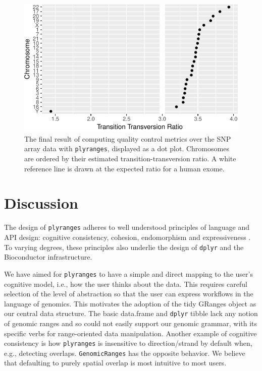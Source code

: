 \documentclass[]{article}
\begin{document}
\begin{figure}

{\centering \includegraphics{./diagrams/titv-viz-1} 

}

\caption{The final result of computing quality control metrics over the SNP array data with \texttt{plyranges}, displayed as a dot plot. Chromosomes are ordered by their estimated transition-transversion ratio. A white reference line is drawn at the expected ratio for a human exome.}\label{fig:titv-viz}
\end{figure}

\hypertarget{discussion}{%
\section{Discussion}\label{discussion}}

The design of \texttt{plyranges} adheres to well understood principles
of language and API design: cognitive consistency, cohesion,
endomorphism and expressiveness \cite{Green1996-qg}. To varying degrees,
these principles also underlie the design of \texttt{dplyr} and the
Bioconductor infrastructure.

We have aimed for \texttt{plyranges} to have a simple and direct mapping
to the user's cognitive model, i.e., how the user thinks about the data.
This requires careful selection of the level of abstraction so that the
user can express workflows in the language of genomics. This motivates
the adoption of the tidy GRanges object as our central data structure.
The basic data.frame and \texttt{dplyr} tibble lack any notion of
genomic ranges and so could not easily support our genomic grammar, with
its specific verbs for range-oriented data manipulation. Another example
of cognitive consistency is how \texttt{plyranges} is insensitive to
direction/strand by default when, e.g., detecting overlaps.
\texttt{GenomicRanges} has the opposite behavior. We believe that
defaulting to purely spatial overlap is most intuitive to most users.
\end{document}
